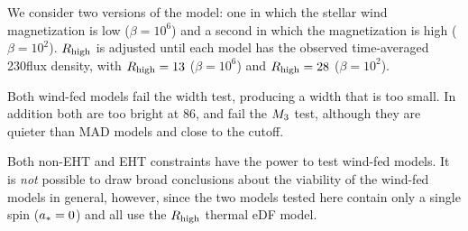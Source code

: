 We consider two versions of the model: one in which the stellar wind magnetization is low ($\beta = 10^6$) and a second in which the magnetization is high ($\beta = 10^2$).
$R_\mathrm{high}$ is adjusted until each model has the observed time-averaged 230\GHz flux density, with $R_\mathrm{high} = 13$ ($\beta = 10^6$) and $R_\mathrm{high} = 28$ ($\beta = 10^2$).

Both wind-fed models fail the \mring width test, producing a width that is too small.
In addition both are too bright at 86\GHz, and fail the $M_{3}$ test, although they are quieter than MAD models and close to the cutoff.

Both non-EHT and EHT constraints have the power to test wind-fed models.
It is {\em not} possible to draw broad conclusions about the viability of the wind-fed models in general, however, since the two models tested here contain only a single spin ($a_*=0$) and all use the $R_\mathrm{high}$ thermal eDF model.

